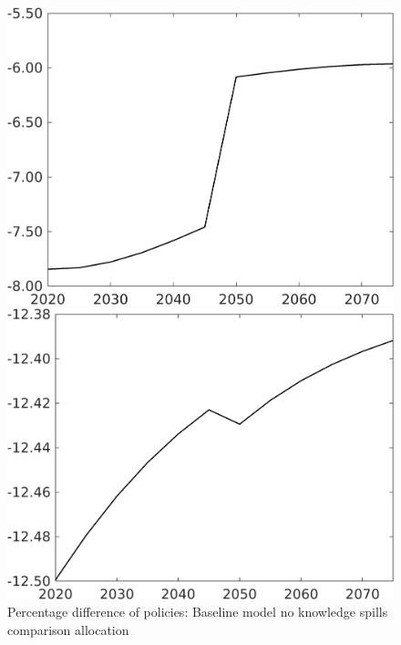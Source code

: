 \documentclass[12pt]{article}
\begin{document}
\begin{figure}[h!!]
	\centering
	\caption{Percentage difference of policies: Baseline model no knowledge spills comparison allocation}\label{fig:Pertauf_nsk0_xgr0_noknow}
	\begin{minipage}[]{0.32\textwidth}
		\includegraphics[width=1\textwidth]{../../codding_model/own_basedOnFried/optimalPol_010922_revision/figures/all_13Sept22/CompTaufPER_bytaul_Equlab_Reg0_tauf_spillover0_nsk0_xgr0_knspil1_sep0_LFlimit1_emsbase0_countec0_GovRev0_etaa0.79_lgd0.png}
	\end{minipage}		
	\begin{minipage}[]{0.32\textwidth}
		\includegraphics[width=1\textwidth]{../../codding_model/own_basedOnFried/optimalPol_010922_revision/figures/all_13Sept22/CompTaufPER_bytaul_Equlab_Reg0_hh_spillover0_nsk0_xgr0_knspil1_sep0_LFlimit1_emsbase0_countec0_GovRev0_etaa0.79_lgd0.png}

\end{minipage}
\end{figure}
\end{document}
